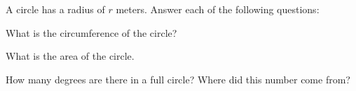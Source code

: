 
\begin{problem}
\item A circle has a radius of $r$ meters. Answer each of the
  following questions:
  \begin{subproblem}
  \item What is the circumference of the circle?
    \vfill
  \item What is the area of the circle.
    \vfill
  \item How many degrees are there in a full circle? Where did this
    number come from?
    \vfill
  \end{subproblem}
\end{problem}


\begin{problem}
\item
  \begin{subproblem}
    \item 


    \item 

      \vfill

    \item 

      \vspace{1em}

    \item 

      \vspace{1em}

      \clearpage
    \item 


    \item 

      \vfill

    \item 

      \vspace{1em}

    \item 

    \vspace{1em}

  \end{subproblem}

  \clearpage

\item 
  \begin{subproblem}
  \item 
    \vfill
  \item 
    \vfill

    \clearpage

  \item 
    \vfill

  \item 
    \vfill


  \item 
    \vfill
  \end{subproblem}

\end{problem}

